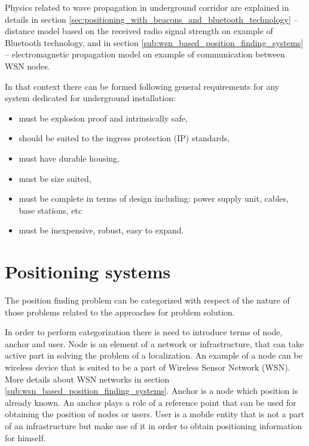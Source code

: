 \documentclass[../main.tex]{subfiles}
\begin{document}
Physics related to wave propagation in underground corridor are explained in details in section \ref{sec:positioning_with_beacons_and_bluetooth_technology} -- distance model based on the received radio signal strength on example of Bluetooth technology, and in section \ref{sub:wsn_based_position_finding_systems} -- electromagnetic propagation model on example of communication between WSN nodes.

In that context there can be formed following general requirements for any system dedicated for underground installation\cite{Book_wireless_in_mines}:
\begin{itemize}
	\item must be explosion proof and intrinsically safe,
	\item should be suited to the ingress protection (IP) standards,
	\item must have durable housing,
	\item must be size suited,
	\item must be complete in terms of design including: power supply unit, cables, base stations, etc
	\item must be inexpensive, robust, easy to expand.
\end{itemize}

\section{Positioning systems}
\label{sec:positioning_systems}

The position finding problem can be categorized with respect of the nature of those problems related to the approaches for problem solution.

In order to perform categorization there is need to introduce terms of node, anchor and user. Node is an element of a network or infrastructure, that can take active part in solving the problem of a localization. An example of a node can be wireless device that is suited to be a part of Wireless Sensor Network (WSN). More details about WSN networks in section \ref{sub:wsn_based_position_finding_systems}. Anchor is a node which position is already known. An anchor plays a role of a reference point that can be used for obtaining the position of nodes or users. User is a mobile entity that is not a part of an infrastructure but make use of it in order to obtain positioning information for himself.
\end{document}
